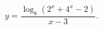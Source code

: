 \begin{ex}[type=inequality]
	\begin{condition}
		$y = \dfrac{\log_8 (2^x + 4^x - 2)}{x - 3}.$
	\end{condition}
\end{ex}